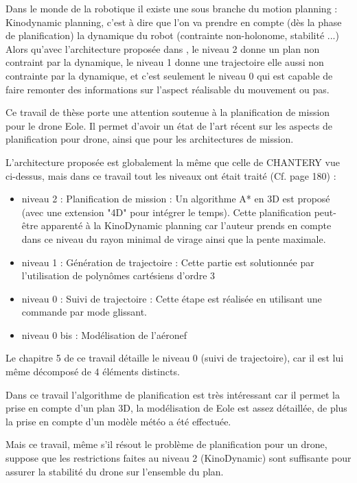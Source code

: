Dans le monde de la robotique il existe une sous branche du motion planning : Kinodynamic planning, c'est à dire que l'on va prendre en compte (dès la phase de planification) la dynamique du robot (contrainte non-holonome, stabilité ...)
Alors qu'avec l'architecture proposée dans \cite{cha05}, le niveau 2 donne un plan non contraint par la dynamique, le niveau 1 donne une trajectoire elle aussi non contrainte par la dynamique, et c'est seulement le niveau 0 qui est capable de faire remonter des informations sur l'aspect réalisable du mouvement ou pas.

\cite{DIC12} Ce travail de thèse porte une attention soutenue à la planification de mission pour le drone Eole. Il permet d'avoir un état de l'art récent sur les aspects de planification pour drone, ainsi que pour les architectures de mission.

L'architecture proposée est globalement la même que celle de CHANTERY vue ci-dessus, mais dans ce travail tout les niveaux ont était traité (Cf. page 180) : 
\begin{itemize}
	\item niveau 2 : Planification de mission : Un algorithme A* en 3D est proposé (avec une extension "4D" pour intégrer le temps). Cette planification peut-être apparenté à la KinoDynamic planning car l'auteur prends en compte dans ce niveau du rayon minimal de virage ainsi que la pente maximale.
	\item niveau 1 : Génération de trajectoire : Cette partie est solutionnée par l'utilisation de polynômes cartésiens d'ordre 3
	\item niveau 0 : Suivi de trajectoire : Cette étape est réalisée en utilisant une commande par mode glissant.
	\item niveau 0 bis : Modélisation de l'aéronef
\end{itemize} 

Le chapitre 5 de ce travail détaille le niveau 0 (suivi de trajectoire), car il est lui même décomposé de 4 éléments distincts.

Dans ce travail l'algorithme de planification est très intéressant car il permet la prise en compte d'un plan 3D, la modélisation de Eole est assez détaillée, de plus la prise en compte d'un modèle météo a été effectuée.

Mais ce travail, même s'il résout le problème de planification pour un drone, suppose que les restrictions faites au niveau 2 (KinoDynamic) sont suffisante pour assurer la stabilité du drone sur l'ensemble du plan.



%
%

